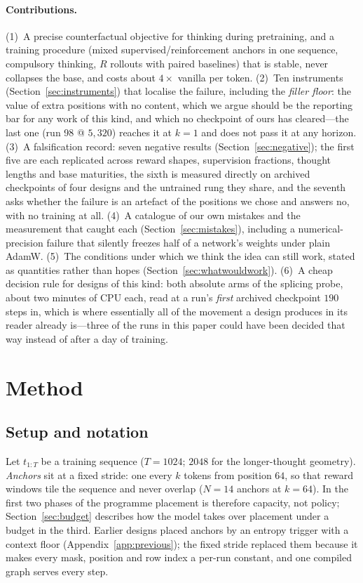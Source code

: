 \documentclass{article} %
\begin{document}
\paragraph{Contributions.}
(1)~A precise counterfactual objective for thinking during pretraining, and a training procedure (mixed supervised/reinforcement anchors in one sequence, compulsory thinking, $R$ rollouts with paired baselines) that is stable, never collapses the base, and costs about $4\times$ vanilla per token.
(2)~Ten instruments (Section~\ref{sec:instruments}) that localise the failure, including the \emph{filler floor}: the value of extra positions with no content, which we argue should be the reporting bar for any work of this kind, and which no checkpoint of ours has cleared---the last one (run 98 @ $5{,}320$) reaches it at $k{=}1$ and does not pass it at any horizon.
(3)~A falsification record: seven negative results (Section~\ref{sec:negative}); the first five are each replicated across reward shapes, supervision fractions, thought lengths and base maturities, the sixth is measured directly on archived checkpoints of four designs and the untrained rung they share, and the seventh asks whether the failure is an artefact of the positions we chose and answers no, with no training at all.
(4)~A catalogue of our own mistakes and the measurement that caught each (Section~\ref{sec:mistakes}), including a numerical-precision failure that silently freezes half of a network's weights under plain AdamW.
(5)~The conditions under which we think the idea can still work, stated as quantities rather than hopes (Section~\ref{sec:whatwouldwork}).
(6)~A cheap decision rule for designs of this kind: both absolute arms of the splicing probe, about two minutes of CPU each, read at a run's \emph{first} archived checkpoint $190$ steps in, which is where essentially all of the movement a design produces in its reader already is---three of the runs in this paper could have been decided that way instead of after a day of training.

\section{Method}
\label{sec:method}

\subsection{Setup and notation}

Let $t_{1:T}$ be a training sequence ($T=1024$; $2048$ for the longer-thought geometry). \emph{Anchors} sit at a fixed stride: one every $k$ tokens from position $64$, so that reward windows tile the sequence and never overlap ($N=14$ anchors at $k=64$). In the first two phases of the programme placement is therefore capacity, not policy; Section~\ref{sec:budget} describes how the model takes over placement under a budget in the third. Earlier designs placed anchors by an entropy trigger with a context floor (Appendix~\ref{app:previous}); the fixed stride replaced them because it makes every mask, position and row index a per-run constant, and one compiled graph serves every step.
\end{document}
